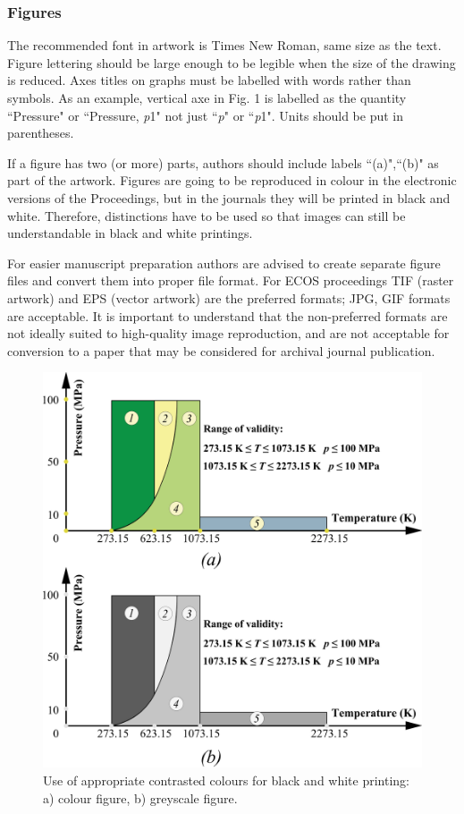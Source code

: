 \documentclass{ECOS_2021}
\begin{document}
\sffamily \subsubsection{Figures} \label{Figures}
\rmfamily
The recommended font in artwork is Times New Roman, same size as the text. Figure lettering should be large enough to be legible when the size of the drawing is reduced. Axes titles on graphs must be labelled with words rather than symbols. As an example, vertical axe in Fig. 1 is labelled as the quantity ``Pressure" or ``Pressure, {\it p}1" not just ``{\it p}" or ``{\it p}1". Units should be put in parentheses.

If a figure has two (or more) parts, authors should include labels ``(a)",``(b)" as part of the artwork. Figures are going to be reproduced in colour in the electronic versions of the Proceedings, but in the journals they will be printed in black and white. Therefore, distinctions have to be used so that images can still be understandable in black and white printings.

For easier manuscript preparation authors are advised to create separate figure files and convert them into proper file format. For ECOS proceedings TIF (raster artwork) and EPS (vector artwork) are the preferred formats; JPG, GIF formats are acceptable. It is important to understand that the non-preferred formats are not ideally suited to high-quality image reproduction, and are not acceptable for conversion to a paper that may be considered for archival journal publication.

\begin{figure}[h!]

    \centering
    \includegraphics{Figure_1.png}
    \caption{Use of appropriate contrasted colours for black and white printing: a) colour figure, b) greyscale figure.}
    \label{Fig_1}       %
\end{figure}
\end{document}
